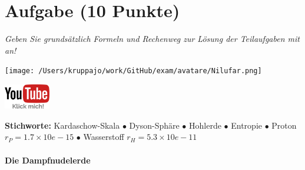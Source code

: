 \documentclass[a4paper, 9pt]{scrartcl}\usepackage[]{graphicx}\usepackage[]{xcolor}
\begin{document}
\section{Aufgabe \hfill (10 Punkte)}

\textit{Geben Sie grundsätzlich Formeln und Rechenweg zur Lösung der Teilaufgaben mit an!} \\[1Ex]
 

 
\ifcollection
\begin{flushright}
\tiny\vspace{-3Ex}
\textbf{\examinhaltstart}
\exammodulemathstat
\vspace{-4Ex}
\end{flushright}
\begin{minipage}[t]{0.5\textwidth}
\texttt{[image: /Users/kruppajo/work/GitHub/exam/avatare/Nilufar.png]}
\end{minipage}
\begin{minipage}[t]{0.5\textwidth}
\hfill
\href{https://youtu.be/WZSxntiNF8s}{\includegraphics[width = 2cm]{img/youtube}}
\end{minipage}
\fi

{\tiny\textbf{Stichworte:} Kardaschow-Skala $\bullet$ Dyson-Sphäre $\bullet$ Hohlerde $\bullet$ Entropie $\bullet$ Proton $r_P = 1.7 \times 10e-15$ $\bullet$ Wasserstoff $r_H = 5.3\times 10e-11$}

\ifcollection
\paragraph{Die Dampfnudelerde}
\fi
\end{document}
